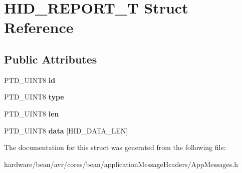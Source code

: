 \hypertarget{struct_h_i_d___r_e_p_o_r_t___t}{}\section{H\+I\+D\+\_\+\+R\+E\+P\+O\+R\+T\+\_\+\+T Struct Reference}
\label{struct_h_i_d___r_e_p_o_r_t___t}
\subsection*{Public Attributes}
\begin{DoxyCompactItemize}
\item 
\hypertarget{struct_h_i_d___r_e_p_o_r_t___t_a4e3b15b71170f48f9d1772e2e5b65f7b}{}P\+T\+D\+\_\+\+U\+I\+N\+T8 {\bfseries id}\label{struct_h_i_d___r_e_p_o_r_t___t_a4e3b15b71170f48f9d1772e2e5b65f7b}

\item 
\hypertarget{struct_h_i_d___r_e_p_o_r_t___t_a293a2b82c572b81d925bb8822435db62}{}P\+T\+D\+\_\+\+U\+I\+N\+T8 {\bfseries type}\label{struct_h_i_d___r_e_p_o_r_t___t_a293a2b82c572b81d925bb8822435db62}

\item 
\hypertarget{struct_h_i_d___r_e_p_o_r_t___t_a833870632158c0c0a2d9727764fcbcb4}{}P\+T\+D\+\_\+\+U\+I\+N\+T8 {\bfseries len}\label{struct_h_i_d___r_e_p_o_r_t___t_a833870632158c0c0a2d9727764fcbcb4}

\item 
\hypertarget{struct_h_i_d___r_e_p_o_r_t___t_a4516a8128b3acb98449e070da9868a1c}{}P\+T\+D\+\_\+\+U\+I\+N\+T8 {\bfseries data} \mbox{[}H\+I\+D\+\_\+\+D\+A\+T\+A\+\_\+\+L\+E\+N\mbox{]}\label{struct_h_i_d___r_e_p_o_r_t___t_a4516a8128b3acb98449e070da9868a1c}

\end{DoxyCompactItemize}


The documentation for this struct was generated from the following file\+:\begin{DoxyCompactItemize}
\item 
hardware/bean/avr/cores/bean/application\+Message\+Headers/App\+Messages.\+h\end{DoxyCompactItemize}
